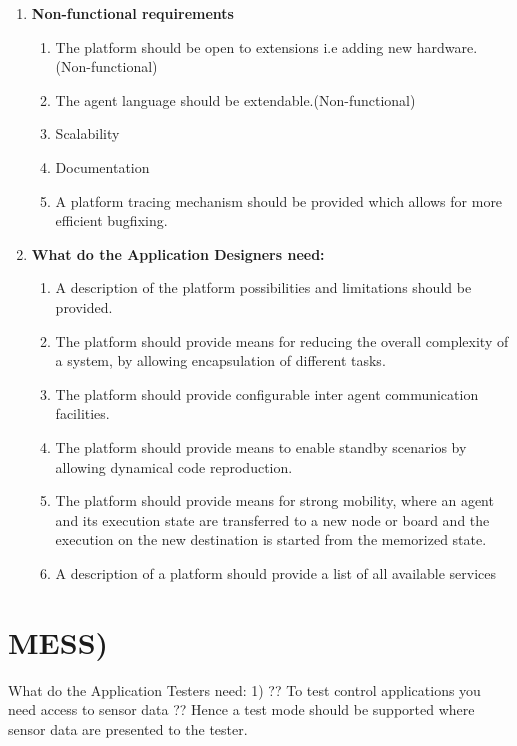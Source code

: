 \documentclass{scrreprt}
\begin{document}
\begin{enumerate}

\item\textbf{Non-functional requirements}

\begin{enumerate}
\item The platform should be open to extensions i.e adding new hardware. (Non-functional)
\item The agent language should be extendable.(Non-functional)
\item Scalability
\item Documentation 
\item A platform tracing mechanism should be provided which allows for more efficient bugfixing.
\end{enumerate}


\item\textbf{What do the Application Designers need:}
\begin{enumerate}
\item A description of the platform possibilities and limitations should be provided.
\item The platform should provide means for reducing the overall complexity of a system, by allowing encapsulation of different tasks.
\item The platform should provide configurable inter agent communication facilities.
\item The platform should provide means to enable standby scenarios by allowing dynamical code reproduction.
\item The platform should provide means for strong mobility, where an agent and its execution state are transferred to a new node or board and
   the execution on the new destination is started from the memorized state.
\item A description of a platform should provide a list of all available services
\end{enumerate}

\end{enumerate}

\section{MESS)}

What do the Application Testers need:
1) ?? To test control applications you need access to sensor data ?? Hence a test mode should be supported where sensor data are presented to the tester.
\end{document}
